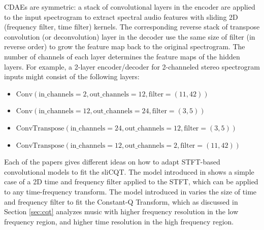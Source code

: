 \documentclass[report.tex]{subfiles}
\begin{document}
CDAEs are symmetric: a stack of convolutional layers in the encoder are applied to the input spectrogram to extract spectral audio features with sliding 2D (frequency filter, time filter) kernels. The corresponding reverse stack of transpose convolution (or deconvolution) layer in the decoder use the same size of filter (in reverse order) to grow the feature map back to the original spectrogram. The number of channels of each layer determines the feature maps of the hidden layers. For example, a 2-layer encoder/decoder for 2-channeled stereo spectrogram inputs might consist of the following layers:

\begin{itemize}
	\item
		$\text{Conv}(\text{in\_channels}=2, \text{out\_channels}=12, \text{filter}=(11,42))$
	\item
		$\text{Conv}(\text{in\_channels}=12, \text{out\_channels}=24, \text{filter}=(3,5))$
	\item
		$\text{ConvTranspose}(\text{in\_channels}=24, \text{out\_channels}=12, \text{filter}=(3,5))$
	\item
		$\text{ConvTranspose}(\text{in\_channels}=12, \text{out\_channels}=2, \text{filter}=(11,42))$
\end{itemize}

Each of the papers gives different ideas on how to adapt STFT-based convolutional models to fit the sliCQT. The model introduced in \textcite{plumbley1} shows a simple case of a 2D time and frequency filter applied to the STFT, which can be applied to any time-frequency transform. The model introduced in \textcite{plumbley2} varies the size of time and frequency filter to fit the Constant-Q Transform, which as discussed in Section \ref{sec:cqt} analyzes music with higher frequency resolution in the low frequency region, and higher time resolution in the high frequency region.
\end{document}

